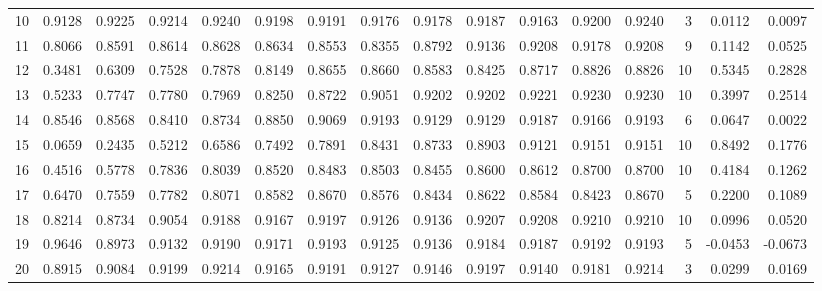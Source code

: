 \begin{tabular}{lrrrrrrrrrrrrrrr}
10  &      0.9128 &  0.9225 &  0.9214 &  0.9240 &  0.9198 &  0.9191 &  0.9176 &  0.9178 &  0.9187 &  0.9163 &   0.9200 &     0.9240 &      3 &                    0.0112 &                     0.0097 \\
11  &      0.8066 &  0.8591 &  0.8614 &  0.8628 &  0.8634 &  0.8553 &  0.8355 &  0.8792 &  0.9136 &  0.9208 &   0.9178 &     0.9208 &      9 &                    0.1142 &                     0.0525 \\
12  &      0.3481 &  0.6309 &  0.7528 &  0.7878 &  0.8149 &  0.8655 &  0.8660 &  0.8583 &  0.8425 &  0.8717 &   0.8826 &     0.8826 &     10 &                    0.5345 &                     0.2828 \\
13  &      0.5233 &  0.7747 &  0.7780 &  0.7969 &  0.8250 &  0.8722 &  0.9051 &  0.9202 &  0.9202 &  0.9221 &   0.9230 &     0.9230 &     10 &                    0.3997 &                     0.2514 \\
14  &      0.8546 &  0.8568 &  0.8410 &  0.8734 &  0.8850 &  0.9069 &  0.9193 &  0.9129 &  0.9129 &  0.9187 &   0.9166 &     0.9193 &      6 &                    0.0647 &                     0.0022 \\
15  &      0.0659 &  0.2435 &  0.5212 &  0.6586 &  0.7492 &  0.7891 &  0.8431 &  0.8733 &  0.8903 &  0.9121 &   0.9151 &     0.9151 &     10 &                    0.8492 &                     0.1776 \\
16  &      0.4516 &  0.5778 &  0.7836 &  0.8039 &  0.8520 &  0.8483 &  0.8503 &  0.8455 &  0.8600 &  0.8612 &   0.8700 &     0.8700 &     10 &                    0.4184 &                     0.1262 \\
17  &      0.6470 &  0.7559 &  0.7782 &  0.8071 &  0.8582 &  0.8670 &  0.8576 &  0.8434 &  0.8622 &  0.8584 &   0.8423 &     0.8670 &      5 &                    0.2200 &                     0.1089 \\
18  &      0.8214 &  0.8734 &  0.9054 &  0.9188 &  0.9167 &  0.9197 &  0.9126 &  0.9136 &  0.9207 &  0.9208 &   0.9210 &     0.9210 &     10 &                    0.0996 &                     0.0520 \\
19  &      0.9646 &  0.8973 &  0.9132 &  0.9190 &  0.9171 &  0.9193 &  0.9125 &  0.9136 &  0.9184 &  0.9187 &   0.9192 &     0.9193 &      5 &                   -0.0453 &                    -0.0673 \\
20  &      0.8915 &  0.9084 &  0.9199 &  0.9214 &  0.9165 &  0.9191 &  0.9127 &  0.9146 &  0.9197 &  0.9140 &   0.9181 &     0.9214 &      3 &                    0.0299 &                     0.0169 \\

\end{tabular}
